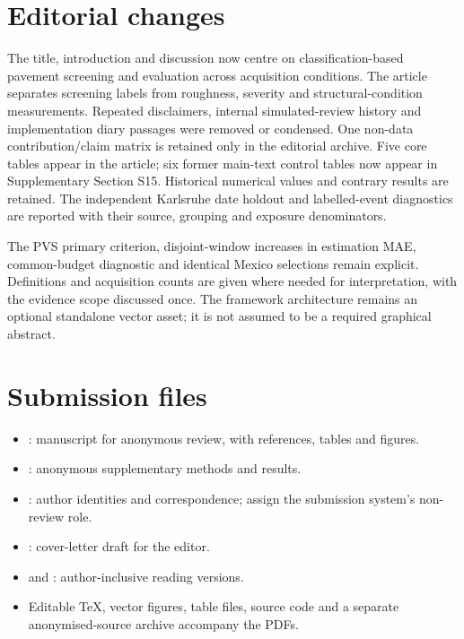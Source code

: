 \documentclass[11pt]{article}
\begin{document}
\section*{Editorial changes}
The title, introduction and discussion now centre on classification-based pavement screening and evaluation across acquisition conditions. The article separates screening labels from roughness, severity and structural-condition measurements. Repeated disclaimers, internal simulated-review history and implementation diary passages were removed or condensed. One non-data contribution/claim matrix is retained only in the editorial archive. Five core tables appear in the article; six former main-text control tables now appear in Supplementary Section S15. Historical numerical values and contrary results are retained. The independent Karlsruhe date holdout and labelled-event diagnostics are reported with their source, grouping and exposure denominators.

The PVS primary criterion, disjoint-window increases in estimation MAE, common-budget diagnostic and identical Mexico selections remain explicit. Definitions and acquisition counts are given where needed for interpretation, with the evidence scope discussed once. The framework architecture remains an optional standalone vector asset; it is not assumed to be a required graphical abstract.

\section*{Submission files}
\begin{itemize}
\item {}: manuscript for anonymous review, with references, tables and figures.
\item {}: anonymous supplementary methods and results.
\item {}: author identities and correspondence; assign the submission system's non-review role.
\item {}: cover-letter draft for the editor.
\item {} and : author-inclusive reading versions.
\item Editable TeX, vector figures, table files, source code and a separate anonymised-source archive accompany the PDFs.
\end{itemize}
\end{document}

